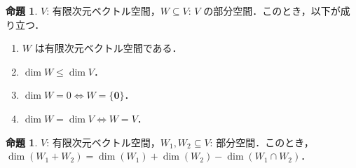 \documentclass{jlreq}
\theoremstyle{definition}
\newtheorem{prop}[thm]{命題}
\begin{document}
      \begin{prop}
        $V$: 有限次元ベクトル空間，$W \subseteq V$: $V$ の部分空間．このとき，以下が成り立つ．
        \begin{enumerate}
          \item $W$ は有限次元ベクトル空間である．
          \item $\dim W \leq \dim V$．
          \item $\dim W = 0 \iff W = \{\bm{0}\}$．
          \item $\dim W = \dim V \iff W = V$．
        \end{enumerate}
      \end{prop}
      \begin{prop}
        $V$: 有限次元ベクトル空間，$W_1, W_2 \subseteq V$: 部分空間．このとき，$\dim(W_1 + W_2) = \dim(W_1) + \dim(W_2) - \dim(W_1 \cap W_2)$．
      \end{prop}
\end{document}
